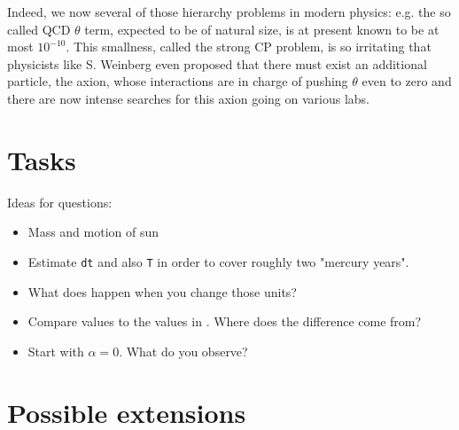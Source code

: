 \documentclass[12pt]{iopart}
\begin{document}
Indeed, we now several of those hierarchy problems in modern physics: e.g. the so called QCD $\theta$ term,
expected to be of natural size, is at present known to be at most $10^{-10}$. This smallness, called the
strong CP problem, is so irritating that physicists like S. Weinberg even proposed that there must exist an
additional particle, the axion, whose interactions are in charge of pushing $\theta$ even to zero and there
are now intense searches for this axion going on various labs.



\section{Tasks}\label{sec:tasks}

Ideas for questions:
\begin{itemize}
	\item Mass and motion of sun
	\item Estimate \texttt{dt} and also \texttt{T} in order to cover roughly two "mercury years".
	\item What does happen when you change those units?
	\item Compare values to the values in \cite{}.  Where does the difference come from?
	\item Start with $\alpha=0$. What do you observe?
\end{itemize}



\section{Possible extensions}\label{sec:extensions}
\end{document}
